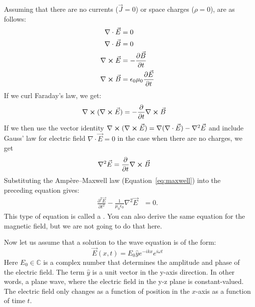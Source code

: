 Assuming that there are no currents ($\vec{J}=0$) or space charges ($\rho=0$),
 are as follows:
\begin{align}
  \nabla \cdot \vec{E}  & = 0                                                                       \\
  \nabla \cdot \vec{B}  & = 0                                                                       \\
  \nabla \cross \vec{E} & = -\frac{\partial \vec{B}}{\partial t} \label{eq:faraday}                 \\
  \nabla \cross \vec{B} & = \epsilon_0 \mu_0 \frac{\partial \vec{E}}{\partial t} \label{eq:maxwell}
\end{align}
If we curl Faraday's law, we get:
\begin{align}
  \nabla \cross (\nabla \cross \vec{E}) & = -\frac{\partial }{\partial t}\nabla \cross \vec{B}
\end{align}
If we then use the vector identity
$\nabla \cross (\nabla \cross \vec{E}) = \nabla(\nabla \cdot \vec{E}) - \nabla^2 \vec{E}$
and include Gauss' law for electric field $\nabla \cdot \vec{E} = 0$
in the case when there are no charges, we get
\begin{align}
  \nabla^2 \vec{E} & = \frac{\partial }{\partial t}\nabla \cross \vec{B}
\end{align}
Substituting the Ampère--Maxwell law (Equation~\ref{eq:maxwell}) into the
preceding equation gives:
\begin{align}
  \frac{\partial^2 \vec{E}}{\partial t^2} - \frac{1}{\mu_0 \epsilon_0} \nabla^2 \vec{E} & = 0.
\end{align}
This type of equation is called a . You can also derive
the same equation for the magnetic field, but we are not going to do that here.

Now let us assume that a solution to the wave equation is of the form:
\begin{equation}
  \vec{E}(x,t)= E_0 \hat{y} e^{-i k x}e^{i\omega t}
  \label{efieldplanewave}
\end{equation}
Here $E_0 \in \mathbb{C}$ is a complex number that determines the amplitude and phase of the
electric field. The term $\hat{y}$ is a unit vector in the y-axis direction.
In other words, a plane wave, where the electric field in the y-z plane is constant-valued.
The electric field only changes as a function of position in the $x$-axis as a function of time $t$.

